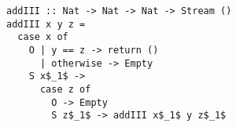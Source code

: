\begin{figure}[!t]
  \centering
  \begin{minipage}{\columnwidth}
    \begin{lstlisting}[frame=tb]
addIII :: Nat -> Nat -> Nat -> Stream ()
addIII x y z =
  case x of
    O | y == z -> return ()
      | otherwise -> Empty
    S x$_1$ ->
      case z of
        O -> Empty
        S z$_1$ -> addIII x$_1$ y z$_1$
    \end{lstlisting}
  \end{minipage}
\end{figure}